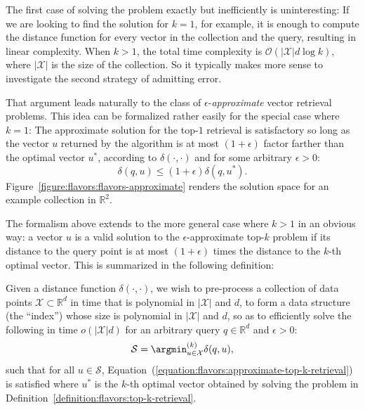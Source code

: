 The first case of solving the problem exactly but inefficiently is uninteresting: If we are looking
to find the solution for $k=1$, for example, it is enough to compute the distance function
for every vector in the collection and the query, resulting in linear complexity.
When $k > 1$, the total time complexity is $\mathcal{O}(\lvert \mathcal{X} \rvert d \log k)$,
where $\lvert \mathcal{X} \rvert$ is the size of the collection.
So it typically makes more sense to investigate the second strategy of admitting error.

That argument leads naturally to the class of $\epsilon$-\emph{approximate} vector retrieval problems.
This idea can be formalized rather easily for the special case where $k=1$:
The approximate solution for the top-$1$ retrieval is satisfactory so long as the vector $u$
returned by the algorithm is at most $(1 + \epsilon)$ factor farther than the
optimal vector $u^\ast$, according to $\delta(\cdot, \cdot)$ and for some arbitrary
$\epsilon > 0$:
\begin{equation}
    \label{equation:flavors:approximate-top-k-retrieval}
    \delta(q, u) \leq (1 + \epsilon) \delta(q, u^\ast).
\end{equation}
Figure~\ref{figure:flavors:flavors-approximate} renders the solution space for
an example collection in $\mathbb{R}^2$.

The formalism above extends to the more general case where $k > 1$ in an obvious way:
a vector $u$ is a valid solution to the $\epsilon$-approximate top-$k$ problem if its distance
to the query point is at most $(1 + \epsilon)$ times the distance to the $k$-th
optimal vector. This is summarized in the following definition:

\begin{definition}
\label{definition:flavors:approximate-top-k-retrieval}
Given a distance function $\delta(\cdot, \cdot)$, we wish to pre-process
a collection of data points $\mathcal{X} \subset \mathbb{R}^d$
in time that is polynomial in $\lvert \mathcal{X} \rvert$ and $d$,
to form a data structure (the ``index'') whose size is polynomial in
$\lvert \mathcal{X} \rvert$ and $d$, so as to efficiently solve
the following in time $o(\lvert \mathcal{X} \rvert d)$
for an arbitrary query $q \in \mathbb{R}^d$ and $\epsilon > 0$:
\begin{equation*}
    \mathcal{S} =\argmin^{(k)}_{u \in \mathcal{X}}  \delta(q, u),
\end{equation*}
such that for all $u \in \mathcal{S}$,
Equation~(\ref{equation:flavors:approximate-top-k-retrieval}) is satisfied
where $u^\ast$ is the $k$-th optimal vector obtained by solving the problem
in Definition~\ref{definition:flavors:top-k-retrieval}.
\end{definition}

